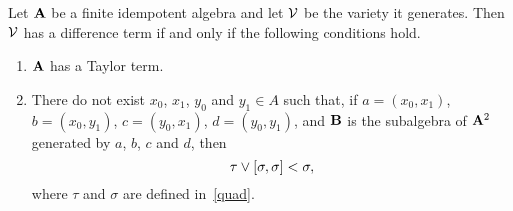 \begin{theorem}
Let $\mathbf{A}$ be a finite idempotent algebra and let $\mathcal{V}$ be the variety 
it generates. Then $\mathcal{V}$ has a difference term if and only if the
following conditions hold.
\begin{enumerate}
\item $\mathbf{A}$ has a Taylor term.
\item There do not exist $x_0$, $x_1$, $y_0$ and $y_1\in A$
such that, if $a = (x_0,x_1)$, $b = (x_0,y_1)$, $c = (y_0,x_1)$,
$d=(y_0,y_1)$, and $\mathbf{B}$ is the subalgebra of $\mathbf{A}^2$ generated
by $a$, $b$, $c$ and $d$, then 
\[
\tau \join [\sigma,\sigma] < \sigma,
\]
where $\tau$ and $\sigma$ are defined in~\eqref{quad}.
\end{enumerate}
\end{theorem}


